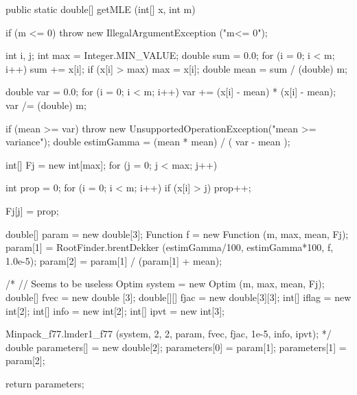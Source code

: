 \begin{htmlonly}
\end{htmlonly}
\begin{code}

   public static double[] getMLE (int[] x, int m)\begin{hide} {
      if (m <= 0)
         throw new IllegalArgumentException ("m<= 0");

      int i, j;
      int max = Integer.MIN_VALUE;
      double sum = 0.0;
      for (i = 0; i < m; i++) {
         sum += x[i];
         if (x[i] > max)
            max = x[i];
      }
      double mean = sum / (double) m;

      double var = 0.0;
      for (i = 0; i < m; i++)
         var += (x[i] - mean) * (x[i] - mean);
      var /= (double) m;

      if (mean >= var) {
         throw new UnsupportedOperationException("mean >= variance");
      }
      double estimGamma = (mean * mean) / ( var - mean );

      int[] Fj = new int[max];
      for (j = 0; j < max; j++) {
         int prop = 0;
         for (i = 0; i < m; i++)
            if (x[i] > j)
               prop++;

         Fj[j] = prop;
      }

      double[] param = new double[3];
      Function f = new Function (m, max, mean, Fj);
      param[1] = RootFinder.brentDekker (estimGamma/100, estimGamma*100, f, 1.0e-5);
      param[2] = param[1] / (param[1] + mean);

/*    // Seems to be useless
      Optim system = new Optim (m, max, mean, Fj);
      double[] fvec = new double [3];
      double[][] fjac = new double[3][3];
      int[] iflag = new int[2];
      int[] info = new int[2];
      int[] ipvt = new int[3];

      Minpack_f77.lmder1_f77 (system, 2, 2, param, fvec, fjac, 1e-5, info, ipvt);
*/
      double parameters[] = new double[2];
      parameters[0] = param[1];
      parameters[1] = param[2];

      return parameters;
   }\end{hide}
\end{code}
